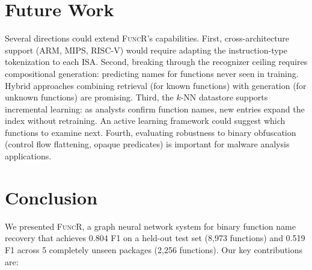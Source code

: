 \documentclass[sigconf,nonacm]{acmart}
\newcommand{\sysname}{\textsc{FuncR}}
\begin{document}
\section{Future Work}
\label{sec:future}

Several directions could extend \sysname{}'s capabilities. First, cross-architecture support (ARM, MIPS, RISC-V) would require adapting the instruction-type tokenization to each ISA. Second, breaking through the recognizer ceiling requires compositional generation: predicting names for functions never seen in training. Hybrid approaches combining retrieval (for known functions) with generation (for unknown functions) are promising. Third, the $k$-NN datastore supports incremental learning: as analysts confirm function names, new entries expand the index without retraining. An active learning framework could suggest which functions to examine next. Fourth, evaluating robustness to binary obfuscation (control flow flattening, opaque predicates) is important for malware analysis applications.

\section{Conclusion}
\label{sec:conclusion}

We presented \sysname{}, a graph neural network system for binary function name recovery that achieves 0.804 F1 on a held-out test set (8,973 functions) and 0.519 F1 across 5 completely unseen packages (2,256 functions). Our key contributions are:
\end{document}
